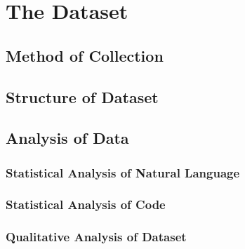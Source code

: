 \chapter{The Dataset}
\label{the_dataset}

\section{Method of Collection} %
\label{sec:method_of_collection}


\section{Structure of Dataset} %
\label{sec:structure_of_dataset}


\section{Analysis of Data} %
\label{sec:analysis_of_data}

\subsection{Statistical Analysis of Natural Language} %
\label{sub:statistical_analysis_of_natural_language}


\subsection{Statistical Analysis of Code} %
\label{sub:statistical_analysis_of_code}


\subsection{Qualitative Analysis of Dataset} %
\label{sub:qualitative_analysis_}

